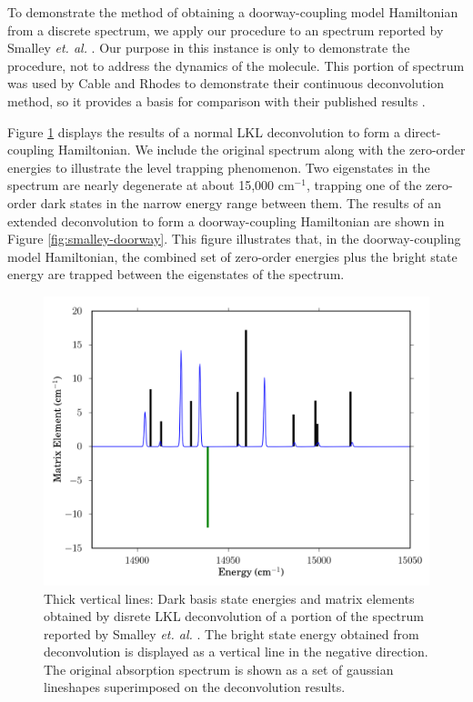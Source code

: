 \documentclass[12pt]{mitthesis}
\begin{document}
To demonstrate the method of obtaining a doorway-coupling model
Hamiltonian from a discrete spectrum, we apply our procedure to an
 spectrum reported by Smalley \emph{et. al.} \cite{smalley75}.
Our purpose in this instance is only to demonstrate the procedure, not
to address the dynamics of the  molecule. This portion of
spectrum was used by Cable and Rhodes to demonstrate their continuous
deconvolution method, so it provides a basis for comparison with their
published results \cite{cable80}.

Figure \ref{fig:smalley-direct} displays the results of a normal LKL
deconvolution to form a direct-coupling Hamiltonian.  We include the
original spectrum along with the zero-order energies to illustrate the
level trapping phenomenon.  Two eigenstates in the spectrum are nearly
degenerate at about 15,000 cm$^{-1}$, trapping one of the zero-order
dark states in the narrow energy range between them.  The results of
an extended deconvolution to form a doorway-coupling Hamiltonian are
shown in Figure \ref{fig:smalley-doorway}.  This figure illustrates
that, in the doorway-coupling model Hamiltonian, the combined set of
zero-order energies plus the bright state energy are trapped between
the eigenstates of the spectrum.  

\begin{figure}
  \caption{Thick vertical lines: Dark basis state energies and matrix
    elements obtained by disrete LKL deconvolution of a portion of the
     spectrum reported by Smalley \emph{et. al.}
    \cite{smalley75}.  The bright state energy obtained from
    deconvolution is displayed as a vertical line in the negative
    direction.  The original absorption spectrum is shown as a set of
    gaussian lineshapes superimposed on the deconvolution results.}
  \label{fig:smalley-direct}
  \centering
  \includegraphics[width=6in]{smalley-direct.png}
\end{figure}
\end{document}
